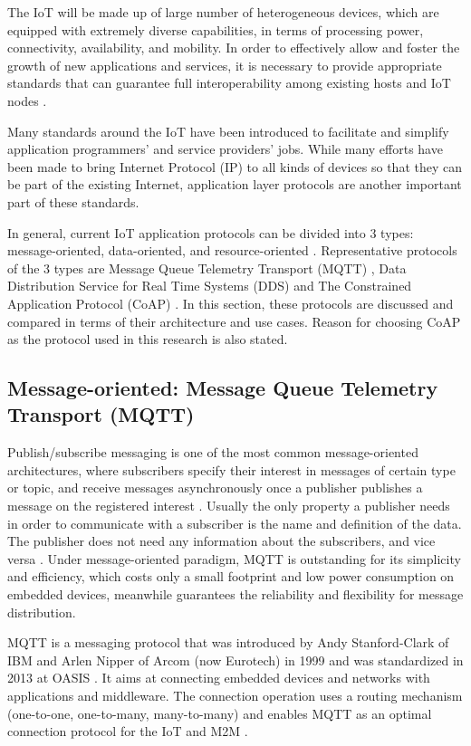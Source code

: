 The IoT will be made up of large number of heterogeneous devices, which are equipped with extremely diverse capabilities, in terms of processing power, connectivity, availability, and mobility. In order to effectively allow and foster the growth of new applications and services, it is necessary to provide appropriate standards that can guarantee full interoperability among existing hosts and IoT nodes \cite{cirani2015mjcoap}. 

Many standards around the IoT have been introduced to facilitate and simplify application programmers' and service providers' jobs. While many efforts have been made to bring Internet Protocol (IP) to all kinds of devices so that they can be part of the existing Internet, application layer protocols are another important part of these standards.

In general, current IoT application protocols can be divided into 3 types: message-oriented, data-oriented, and resource-oriented \cite{7396558}. Representative protocols of the 3 types are Message Queue Telemetry Transport (MQTT) \cite{mqtt_protocol}, Data Distribution Service for Real Time Systems (DDS) \cite{dds} and The Constrained Application Protocol (CoAP) \cite{coap_protocol}. In this section, these protocols are discussed and compared in terms of their architecture and use cases. 
Reason for choosing CoAP as the protocol used in this research is also stated. 

\subsection{Message-oriented:  Message Queue Telemetry Transport (MQTT)}
Publish/subscribe messaging is one of the most common message-oriented architectures, where subscribers specify their interest in messages of certain type or topic, and receive messages asynchronously once a publisher publishes a message on the registered interest \cite{6918928}. Usually the only property a publisher needs in order to communicate with a subscriber is the name and definition of the data. The publisher does not need any information about the subscribers, and vice versa \cite{pardo2005introduction}. Under message-oriented paradigm, MQTT is outstanding for its simplicity and efficiency, which costs only a small footprint and low power consumption on embedded devices, meanwhile guarantees the reliability and flexibility for message distribution.

MQTT is a messaging protocol that was introduced by Andy Stanford-Clark of IBM and Arlen Nipper of Arcom (now Eurotech) in 1999 and was standardized in 2013 at OASIS \cite{mqtt_protocol}. It aims at connecting embedded devices and networks with applications and middleware. The connection operation uses a routing mechanism (one-to-one, one-to-many, many-to-many) and enables MQTT as an optimal connection protocol for the IoT and M2M \cite{7123563}. 

